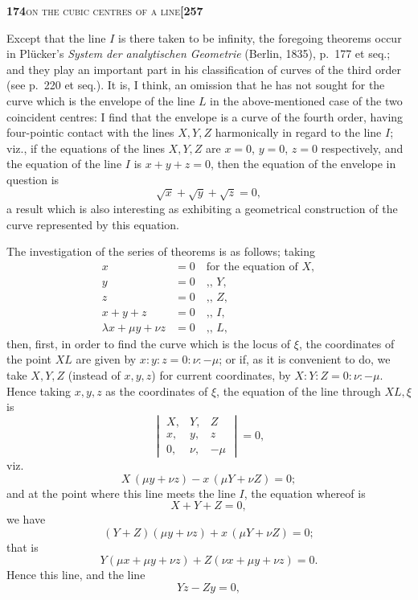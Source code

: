 \documentclass[11pt]{article}
\begin{document}
\newpage

\noindent\textbf{174}\hfill\textsc{on the cubic centres of a line}\hfill\textbf{[257}

\medskip

\noindent Except that the line $I$ is there taken to be infinity, the foregoing theorems occur in Plücker's \textit{System der analytischen Geometrie} (Berlin, 1835), p.~177 et seq.; and they play an important part in his classification of curves of the third order (see p.~220 et seq.). It is, I think, an omission that he has not sought for the curve which is the envelope of the line $L$ in the above-mentioned case of the two coincident centres: I find that the envelope is a curve of the fourth order, having four-pointic contact with the lines $X, Y, Z$ harmonically in regard to the line $I$; viz., if the equations of the lines $X, Y, Z$ are $x = 0$, $y = 0$, $z = 0$ respectively, and the equation of the line $I$ is $x + y + z = 0$, then the equation of the envelope in question is
\[
\sqrt{x} + \sqrt{y} + \sqrt{z} = 0,
\]
a result which is also interesting as exhibiting a geometrical construction of the curve represented by this equation.

The investigation of the series of theorems is as follows; taking
\begin{align*}
x &= 0 \quad \text{for the equation of } X,\\
y &= 0 \quad \text{,, \ \ \ \ \ \ \ \ \ \ \ \ \ \ \ \ \ } Y,\\
z &= 0 \quad \text{,, \ \ \ \ \ \ \ \ \ \ \ \ \ \ \ \ \ } Z,\\
x + y + z &= 0 \quad \text{,, \ \ \ \ \ \ \ \ \ \ \ \ \ \ \ \ \ } I,\\
\lambda x + \mu y + \nu z &= 0 \quad \text{,, \ \ \ \ \ \ \ \ \ \ \ \ \ \ \ \ \ } L,
\end{align*}
then, first, in order to find the curve which is the locus of $\xi$, the coordinates of the point $XL$ are given by $x : y : z = 0 : \nu : -\mu$; or if, as it is convenient to do, we take $X, Y, Z$ (instead of $x, y, z$) for current coordinates, by $X : Y : Z = 0 : \nu : -\mu$. Hence taking $x, y, z$ as the coordinates of $\xi$, the equation of the line through $XL, \xi$ is
\[
\begin{vmatrix} X, & Y, & Z \\ x, & y, & z \\ 0, & \nu, & -\mu \end{vmatrix} = 0,
\]
viz.
\[
X\,(\mu y + \nu z) - x\,(\mu Y + \nu Z) = 0;
\]
and at the point where this line meets the line $I$, the equation whereof is
\[
X + Y + Z = 0,
\]
we have
\[
(Y + Z)(\mu y + \nu z) + x\,(\mu Y + \nu Z) = 0;
\]
that is
\[
Y(\mu x + \mu y + \nu z) + Z(\nu x + \mu y + \nu z) = 0.
\]
Hence this line, and the line
\[
Yz - Zy = 0,
\]
\end{document}
